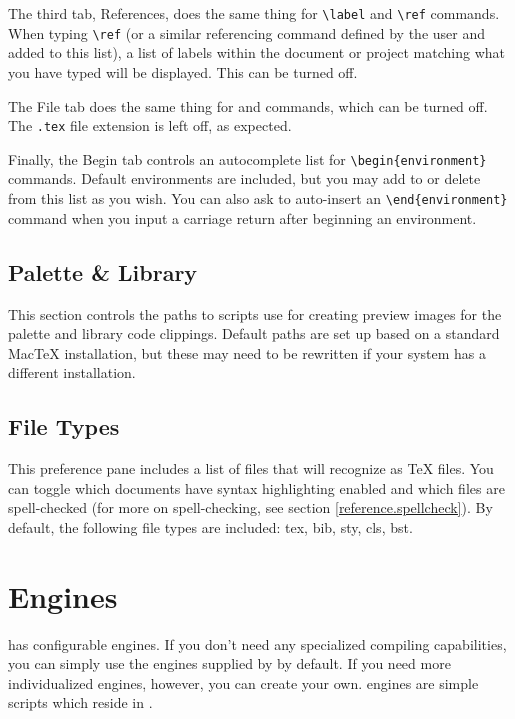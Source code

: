 The third tab, References, does the same thing for \verb|\label| and \verb|\ref| commands. When typing \verb|\ref| (or a similar referencing command defined by the user and added to this list), a list of labels within the document or project matching what you have typed will be displayed. This can be turned off.

The File tab does the same thing for \verb|| and \verb|| commands, which can be turned off. The \verb|.tex| file extension is left off, as expected.

Finally, the Begin tab controls an autocomplete list for \verb|\begin{environment}| commands. Default environments are included, but you may add to or delete from this list as you wish. You can also ask \texnicle to auto-insert an \verb|\end{environment}| command when you input a carriage return after beginning an environment.

\subsection{Palette \& Library}
\label{reference.prefs.palettelibrary}
This section controls the paths to scripts use for creating preview images for the palette and library code clippings. Default paths are set up based on a standard MacTeX installation, but these may need to be rewritten if your system has a different installation.

\subsection{File Types}
\label{reference.prefs.filetypes}
This preference pane includes a list of files that \texnicle will recognize as {\TeX} files. You can toggle which documents have syntax highlighting enabled and which files are spell-checked (for more on spell-checking, see section \ref{reference.spellcheck}). By default, the following file types are included: tex, bib, sty, cls, bst.

\section{Engines}
\label{reference.engines}
\texnicle has configurable engines. If you don't need any specialized compiling capabilities, you can simply use the engines supplied by \texnicle by default. If you need more individualized engines, however, you can create your own. \texnicle engines are simple scripts which reside in .

